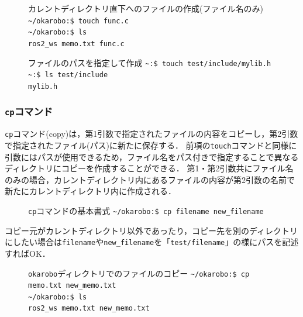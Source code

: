 \documentclass[autodetect-engine,dvi=dvipdfmx,ja=standard,a4j]{bxjsarticle}
\newcommand{\cmd}[1]{\textcolor{yellow!70!white} {#1}}
\newcommand{\dirpath}[1]{\textcolor{Cerulean}{#1}}
\newcommand{\prompt}[1]{\texttt{\dirpath{#1}:\$ }}
\newcommand{\termtext}[2]{\Large{\prompt{#1}\texttt{#2}}}
\begin{document}
\begin{figure}[H]
    \begin{terminal}{カレントディレクトリ直下へのファイルの作成(ファイル名のみ)}
        \termtext{\textasciitilde/okarobo}{\cmd{touch} func.c} \\
        \termtext{\textasciitilde/okarobo}{ls} \\
        \texttt{\textcolor{dircolor}{ros2\_ws} memo.txt func.c}
    \end{terminal}
\end{figure}

\begin{figure}[H]
    \begin{terminal}{ファイルのパスを指定して作成}
        \termtext{\textasciitilde}{\cmd{touch} test/include/mylib.h} \\
        \termtext{\textasciitilde}{ls test/include} \\
        \texttt{mylib.h}
    \end{terminal}
\end{figure}

\subsubsection{\texttt{cp}コマンド}
\verb|cp|コマンド(copy)は，第1引数で指定されたファイルの内容をコピーし，第2引数で指定されたファイル(パス)に新たに保存する．
前項の\verb|touch|コマンドと同様に引数にはパスが使用できるため，ファイル名をパス付きで指定することで異なるディレクトリにコピーを作成することができる．
第1・第2引数共にファイル名のみの場合，カレントディレクトリ内にあるファイルの内容が第2引数の名前で新たにカレントディレクトリ内に作成される．

\begin{figure}[H]
    \begin{terminal}{\texttt{cp}コマンドの基本書式}
        \termtext{\textasciitilde/okarobo}{\cmd{cp} filename new\_filename} 
    \end{terminal}
\end{figure}

コピー元がカレントディレクトリ以外であったり，コピー先を別のディレクトリにしたい場合は\verb|filename|や\verb|new_filename|を「\verb|test/filename|」の様にパスを記述すればOK．

\begin{figure}[H]
    \begin{terminal}{\texttt{okarobo}ディレクトリでのファイルのコピー}
        \termtext{\textasciitilde/okarobo}{\cmd{cp} memo.txt new\_memo.txt} \\
        \termtext{\textasciitilde/okarobo}{ls} \\
        \texttt{\textcolor{dircolor}{ros2\_ws} memo.txt new\_memo.txt}
    \end{terminal}
\end{figure}
\end{document}
